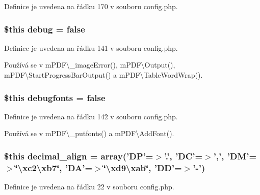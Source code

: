 Definice je uvedena na řádku 170 v souboru config.\-php.

\hypertarget{config_8php_a350aa2f39cda347f49239e15d2365189}{
\subsubsection[{debug}]{\setlength{\rightskip}{0pt plus 5cm}\$this debug = {\bf false}}}\label{config_8php_a350aa2f39cda347f49239e15d2365189}


Definice je uvedena na řádku 141 v souboru config.\-php.



Používá se v m\-P\-D\-F\textbackslash{}\-\_\-image\-Error(), m\-P\-D\-F\textbackslash{}\-Output(), m\-P\-D\-F\textbackslash{}\-Start\-Progress\-Bar\-Output() a m\-P\-D\-F\textbackslash{}\-Table\-Word\-Wrap().

\hypertarget{config_8php_a1e90fccb91d24503ef79c7d6e1b6ab43}{
\subsubsection[{debugfonts}]{\setlength{\rightskip}{0pt plus 5cm}\$this debugfonts = {\bf false}}}\label{config_8php_a1e90fccb91d24503ef79c7d6e1b6ab43}


Definice je uvedena na řádku 142 v souboru config.\-php.



Používá se v m\-P\-D\-F\textbackslash{}\-\_\-putfonts() a m\-P\-D\-F\textbackslash{}\-Add\-Font().

\hypertarget{config_8php_a93e75bd3c5d3fbd3597725a7a860b96f}{
\subsubsection[{decimal\-\_\-align}]{\setlength{\rightskip}{0pt plus 5cm}\$this decimal\-\_\-align = array('D\-P'=$>$'.', 'D\-C'=$>$',', 'D\-M'=$>$\char`\"{}\textbackslash{}xc2\textbackslash{}xb7\char`\"{}, 'D\-A'=$>$\char`\"{}\textbackslash{}xd9\textbackslash{}xab\char`\"{}, 'D\-D'=$>$'-\/')}}\label{config_8php_a93e75bd3c5d3fbd3597725a7a860b96f}


Definice je uvedena na řádku 22 v souboru config.\-php.



